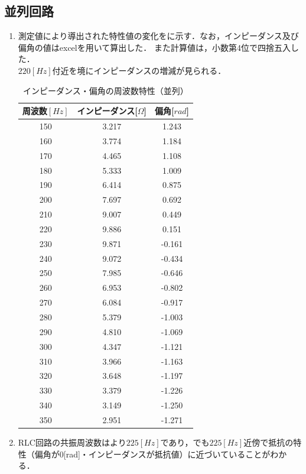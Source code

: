 \documentclass[11pt,dvipdfmx]{jarticle}
\begin{document}
\subsection{並列回路}
\begin{enumerate}
\item 測定値により導出された特性値の変化をに示す．なお，インピーダンス及び偏角の値はexcelを用いて算出した．
また計算値は，小数第4位で四捨五入した．\\
$220[Hz]$付近を境にインピーダンスの増減が見られる． 

\begin{table}[hbtp]
  \centering
  \caption{インピーダンス・偏角の周波数特性（並列）}
  \label{tab:3}
  \begin{tabular}{ccc}
    \hline
    周波数$[Hz]$&インピーダンス[$\Omega$]&偏角[$rad$]\\
    \hline
    150 & 3.217 & 1.243 \\
    160 & 3.774 & 1.184 \\
    170 & 4.465 & 1.108 \\
    180 & 5.333 & 1.009 \\
    190 & 6.414 & 0.875 \\
    200 & 7.697 & 0.692 \\
    210 & 9.007 & 0.449 \\
    220 & 9.886 & 0.151 \\
    230 & 9.871 & -0.161 \\
    240 & 9.072 & -0.434 \\
    250 & 7.985 & -0.646 \\
    260 & 6.953 & -0.802 \\
    270 & 6.084 & -0.917 \\
    280 & 5.379 & -1.003 \\
    290 & 4.810 & -1.069 \\
    300 & 4.347 & -1.121 \\
    310 & 3.966 & -1.163 \\
    320 & 3.648 & -1.197 \\
    330 & 3.379 & -1.226 \\
    340 & 3.149 & -1.250 \\
    350 & 2.951 & -1.271 \\
    \hline
\end{tabular}
\end{table}
\item RLC回路の共振周波数はより$225[Hz]$であり，でも$225[Hz]$近傍で抵抗の特性（偏角が0[rad]・インピーダンスが抵抗値）に近づいていることがわかる．\\

\end{enumerate}
\end{document}
